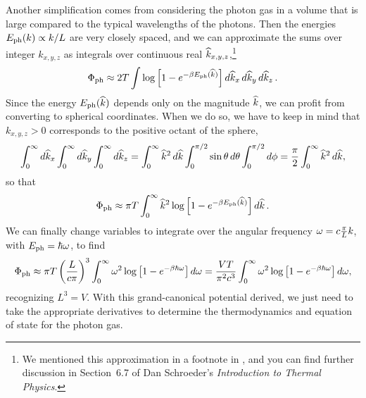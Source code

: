 Another simplification comes from considering the photon gas in a volume that is large compared to the typical wavelengths of the photons. %
Then the energies $E_{\text{ph}}(k) \propto k / L$ are very closely spaced, and we can approximate the sums over integer $k_{x, y, z}$ as integrals over continuous real $\widehat k_{x, y, z}$,\footnote{We mentioned this approximation in a footnote in , and you can find further discussion in Section~6.7 of Dan Schroeder's \textit{Introduction to Thermal Physics}.} %
\begin{equation*}
  \Phi_{\text{ph}} \approx 2T \int \log\left[1 - e^{-\beta E_{\text{ph}}(\widehat k)}\right] \mathop{d\widehat k_x} \mathop{d\widehat k_y} \mathop{d\widehat k_z}.
\end{equation*}
Since the energy $E_{\text{ph}}(\widehat k)$ depends only on the magnitude $\widehat k$, we can profit from converting to spherical coordinates.
When we do so, we have to keep in mind that $k_{x, y, z} > 0$ corresponds to the positive octant of the sphere,
\begin{equation*}
  \int_0^{\infty} d\widehat k_x \int_0^{\infty} d\widehat k_y \int_0^{\infty} d\widehat k_z = \int_0^{\infty} \widehat k^2 \mathop{d\widehat k} \int_0^{\pi / 2} \sin\theta \mathop{d\theta} \int_0^{\pi / 2} d\phi = \frac{\pi}{2} \int_0^{\infty} \widehat k^2 \mathop{d\widehat k},
\end{equation*}
so that
\begin{equation*}
  \Phi_{\text{ph}} \approx \pi T \int_0^{\infty} \widehat k^2 \log\left[1 - e^{-\beta E_{\text{ph}}(\widehat k)}\right] \mathop{d\widehat k}.
\end{equation*}
We can finally change variables to integrate over the angular frequency $\omega = c \frac{\pi}{L} k$, with $E_{\text{ph}} = \hbar \omega$, to find
\begin{equation}
  \label{eq:photon_grand}
  \Phi_{\text{ph}} \approx \pi T \left(\frac{L}{c \pi}\right)^3 \int_0^{\infty} \omega^2 \log\left[1 - e^{-\beta \hbar \omega}\right] \mathop{d\omega} = \frac{VT}{\pi^2 c^3} \int_0^{\infty} \omega^2 \log\left[1 - e^{-\beta \hbar \omega}\right] \mathop{d\omega},
\end{equation}
recognizing $L^3 = V$.
With this grand-canonical potential derived, we just need to take the appropriate derivatives to determine the thermodynamics and equation of state for the photon gas.



\newpage %
